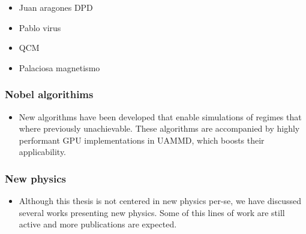 \documentclass[ twoside,openright,titlepage,numbers=noenddot,%
headinclude,footinclude,cleardoublepage=empty,abstract=on,
BCOR=5mm,paper=a4,fontsize=11pt, dvipsnames
]{scrreprt}
\begin{document}
\begin{itemize}
\item Juan aragones DPD
\item Pablo virus
\item QCM
\item Palaciosa magnetismo
\end{itemize}

\subsubsection*{Nobel algorithims}
\begin{itemize}
\item New algorithms have been developed that enable simulations of regimes that where previously unachievable. These algorithms are accompanied by highly performant GPU implementations in UAMMD, which boosts their applicability.
\end{itemize}


\subsubsection*{New physics}
\begin{itemize}
\item Although this thesis is not centered in new physics per-se, we have discussed several works presenting new physics. Some of this lines of work are still active and more publications are expected.
\end{itemize}

\end{document}
